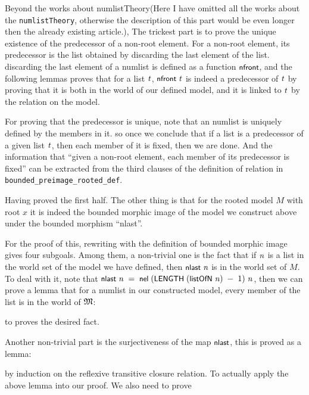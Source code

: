 \documentclass{report}
\renewcommand{\HOLConst}[1]{{\textsf{\upshape\small #1}}}
\renewcommand{\HOLinline}[1]{\ensuremath{#1}}
\begin{document}
Beyond the works about numlistTheory(Here I have omitted all the works about the \texttt{numlistTheory}, otherwise the description of this part would be even longer then the already existing article.), The trickest part is to prove the unique existence of the predecessor of a non-root element. For a non-root element, its predecessor is the list obtained by discarding the last element of the list. discarding the last element of a numlist is defined as a function \HOLinline{\HOLConst{nfront}}, and the following lemmas proves that for a list \HOLinline{\HOLFreeVar{t}}, \HOLinline{\HOLConst{nfront}\;\HOLFreeVar{t}} is indeed a predecessor of \HOLinline{\HOLFreeVar{t}} by proving that it is both in the world of our defined model, and it is linked to \HOLinline{\HOLFreeVar{t}} by the relation on the model.

For proving that the predecessor is unique, note that an numlist is uniquely defined by the members in it. so once we conclude that if a list is a predecessor of a given list \HOLinline{\HOLFreeVar{t}}, then each member of it is fixed, then we are done. And the information that ``given a non-root element, each member of its predecessor is fixed'' can be extracted from the third clauses of the definition of relation in \texttt{bounded_preimage_rooted_def}.

Having proved the first half. The other thing is that for the rooted model $M$ with root $x$ it is indeed the bounded morphic image of the model we construct above under the bounded morphism ``nlast''.

For the proof of this, rewriting with the definition of bounded morphic image gives four subgoals. Among them, a non-trivial one is the fact that if \HOLinline{\HOLFreeVar{n}} is a list in the world set of the model we have defined, then \HOLinline{\HOLConst{nlast}\;\HOLFreeVar{n}} is in the world set of $M$. To deal with it, note that \HOLinline{\HOLConst{nlast}\;\HOLFreeVar{n}\;\HOLSymConst{=}\;\HOLConst{nel}\;(\HOLConst{LENGTH}\;(\HOLConst{listOfN}\;\HOLFreeVar{n})\;\HOLSymConst{\ensuremath{-}}\;\HOLNumLit{1})\;\HOLFreeVar{n}}, then we can prove a lemma that for a numlist in our constructed model, every member of the list is in the world of \HOLinline{\HOLFreeVar{\ensuremath{\mathfrak{M}}}}:

to proves the desired fact.

Another non-trivial part is the surjectiveness of the map \HOLinline{\HOLConst{nlast}}, this is proved as a lemma:

by induction on the reflexive transitive closure relation. To actually apply the above lemma into our proof. We also need to prove
\end{document}
